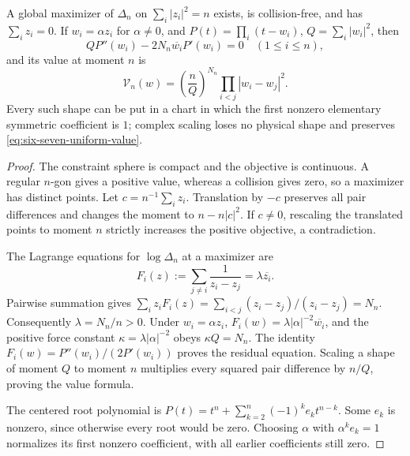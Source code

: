 \begin{lemma}
\label{lem:six-seven-chart-reduction}
A global maximizer of $\Delta_n$ on $\sum_i|z_i|^2=n$ exists, is
collision-free, and has $\sum_i z_i=0$. If $w_i=\alpha z_i$ for
$\alpha\ne0$, and $P(t)=\prod_i(t-w_i)$, $Q=\sum_i|w_i|^2$, then
\begin{equation}\label{eq:six-seven-uniform-residual}
 QP''(w_i)-2N_n\overline{w_i}P'(w_i)=0\quad(1\le i\le n),
\end{equation}
and its value at moment $n$ is
\begin{equation}\label{eq:six-seven-uniform-value}
 \mathcal V_n(w)=\left(\frac nQ\right)^{N_n}
                    \prod_{i<j}|w_i-w_j|^2.
\end{equation}
Every such shape can be put in a chart in which the first nonzero
elementary symmetric coefficient is $1$; complex scaling loses no
physical shape and preserves \eqref{eq:six-seven-uniform-value}.
\end{lemma}
\begin{proof}
The constraint sphere is compact and the objective is continuous.
A regular $n$-gon gives a positive value, whereas a collision gives
zero, so a maximizer has distinct points. Let $c=n^{-1}\sum_i z_i$.
Translation by $-c$ preserves all pair differences and changes the
moment to $n-n|c|^2$. If $c\ne0$, rescaling the translated points to
moment $n$ strictly increases the positive objective, a contradiction.

The Lagrange equations for $\log\Delta_n$ at a maximizer are
\[
 F_i(z):=\sum_{j\ne i}\frac1{z_i-z_j}=\lambda\overline{z_i}.
\]
Pairwise summation gives
$\sum_i z_iF_i(z)=\sum_{i<j}(z_i-z_j)/(z_i-z_j)=N_n$.
Consequently $\lambda=N_n/n>0$. Under $w_i=\alpha z_i$,
$F_i(w)=\lambda|\alpha|^{-2}\overline{w_i}$, and the positive
force constant $\kappa=\lambda|\alpha|^{-2}$ obeys $\kappa Q=N_n$.
The identity $F_i(w)=P''(w_i)/(2P'(w_i))$ proves the residual equation.
Scaling a shape of moment $Q$ to moment $n$ multiplies every squared
pair difference by $n/Q$, proving the value formula.

The centered root polynomial is
$P(t)=t^n+\sum_{k=2}^n(-1)^ke_k t^{n-k}$.
Some $e_k$ is nonzero, since otherwise every root would be zero.
Choosing $\alpha$ with $\alpha^ke_k=1$ normalizes its first nonzero
coefficient, with all earlier coefficients still zero.
\end{proof}

